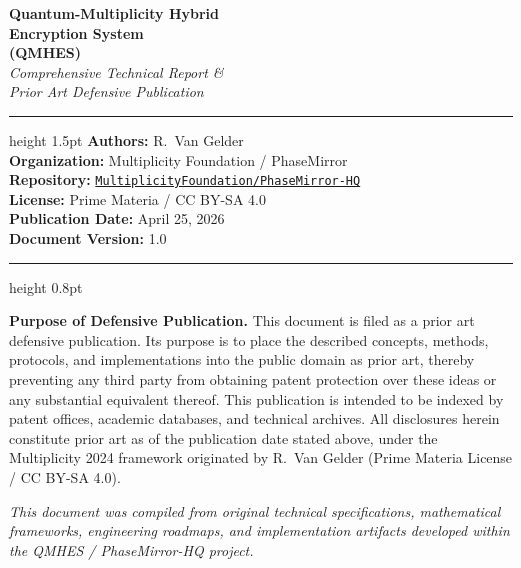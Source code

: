 \documentclass[12pt,letterpaper]{article}
\theoremstyle{plain}
\theoremstyle{definition}
\begin{document}

\begin{titlepage}
\centering
\vspace*{1.5cm}
{\Huge\bfseries\color{blue!80!black}
  Quantum-Multiplicity Hybrid\\[0.4em]
  Encryption System\\[0.3em]
  (QMHES)
}\\[1.2em]
{\Large\itshape
  Comprehensive Technical Report \&\\
  Prior Art Defensive Publication
}\\[2em]
\hrule height 1.5pt
\vspace{1.5em}
{\large
  \textbf{Authors:} R.\ Van Gelder\\[0.4em]
  \textbf{Organization:} Multiplicity Foundation / PhaseMirror\\[0.4em]
  \textbf{Repository:} \href{https://github.com/MultiplicityFoundation/PhaseMirror-HQ}%
    {\texttt{MultiplicityFoundation/PhaseMirror-HQ}}\\[0.4em]
  \textbf{License:} Prime Materia / CC BY-SA 4.0\\[0.4em]
  \textbf{Publication Date:} April 25, 2026\\[0.4em]
  \textbf{Document Version:} 1.0
}\\[2em]
\hrule height 0.8pt
\vspace{2em}

\begin{defensebox}
\textbf{Purpose of Defensive Publication.}
This document is filed as a prior art defensive publication. Its purpose is to
place the described concepts, methods, protocols, and implementations into the
public domain as prior art, thereby preventing any third party from obtaining
patent protection over these ideas or any substantial equivalent thereof.
This publication is intended to be indexed by patent offices, academic
databases, and technical archives. All disclosures herein constitute prior art
as of the publication date stated above, under the Multiplicity 2024 framework
originated by R.\ Van Gelder (Prime Materia License / CC BY-SA 4.0).
\end{defensebox}

\vfill
\small\textit{This document was compiled from original technical
specifications, mathematical frameworks, engineering roadmaps, and
implementation artifacts developed within the QMHES / PhaseMirror-HQ project.}
\end{titlepage}
\end{document}
